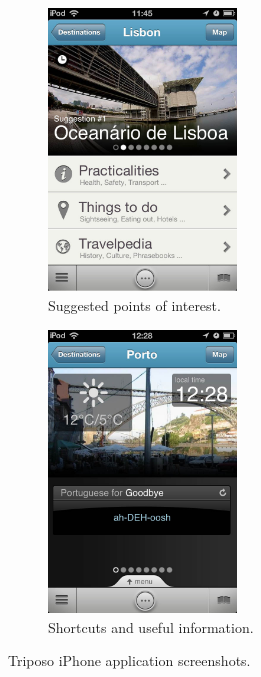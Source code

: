 \begin{figure}
        \centering
        \begin{subfigure}[b]{0.25\textwidth}
                \centering
                \includegraphics[height=7.5cm]{./images/screenshots/screenshot_triposo_1.jpg}
                \caption{Suggested points of interest.}
                \label{fig:triposoSuggestedPointsOfInterest}
        \end{subfigure}%
        \quad\quad\quad\quad\quad
        \begin{subfigure}[b]{0.25\textwidth}
                \centering
                \includegraphics[height=7.5cm]{./images/screenshots/screenshot_triposo_2.jpg}
                \caption{Shortcuts and useful information.}
                \label{fig:triposoWeahtherTime}
        \end{subfigure}%
        \caption{Triposo iPhone application screenshots.}
        \label{fig:triposoScreenshots}
\end{figure}


